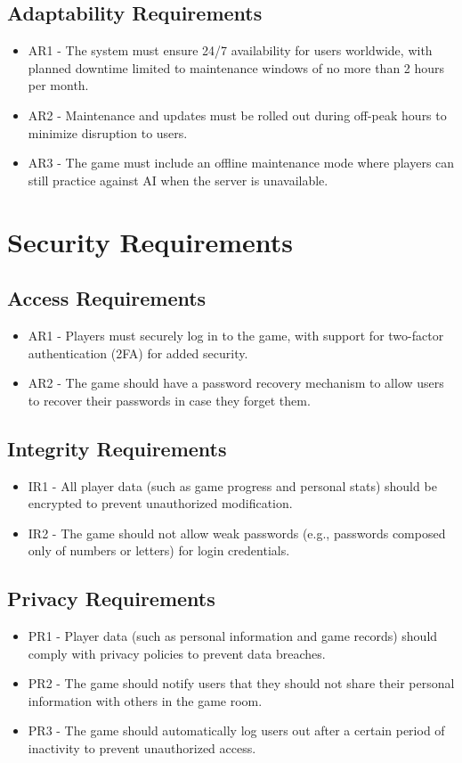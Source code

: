 \documentclass[12pt]{article}
\begin{document}
\subsection{Adaptability Requirements}
\begin{itemize}
    \item AR1 - The system must ensure 24/7 availability for users worldwide, with planned downtime limited to maintenance windows of no more than 2 hours per month.
    \item AR2 - Maintenance and updates must be rolled out during off-peak hours to minimize disruption to users.
    \item AR3 - The game must include an offline maintenance mode where players can still practice against AI when the server is unavailable.
\end{itemize}

\section{Security Requirements}

\subsection{Access Requirements}
\begin{itemize}
    \item AR1 - Players must securely log in to the game, with support for two-factor authentication (2FA) for added security.
    \item AR2 - The game should have a password recovery mechanism to allow users to recover their passwords in case they forget them.
\end{itemize}

\subsection{Integrity Requirements}
\begin{itemize}
    \item IR1 - All player data (such as game progress and personal stats) should be encrypted to prevent unauthorized modification.
    \item IR2 - The game should not allow weak passwords (e.g., passwords composed only of numbers or letters) for login credentials.
\end{itemize}

\subsection{Privacy Requirements}
\begin{itemize}
    \item PR1 - Player data (such as personal information and game records) should comply with privacy policies to prevent data breaches.
    \item PR2 - The game should notify users that they should not share their personal information with others in the game room.
    \item PR3 - The game should automatically log users out after a certain period of inactivity to prevent unauthorized access.
\end{itemize}
\end{document}
